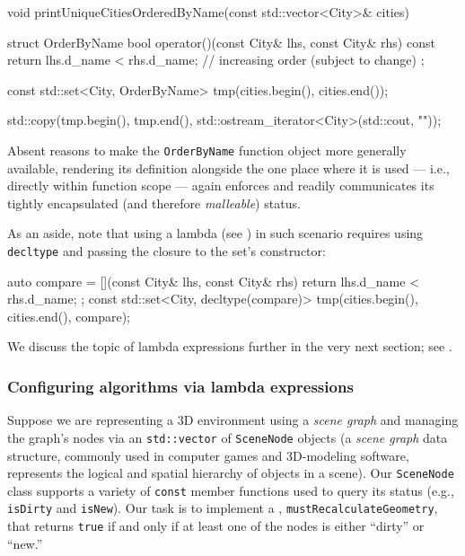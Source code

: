 \begin{emcppslisting}[language=C++]
void printUniqueCitiesOrderedByName(const std::vector<City>& cities)
{
    struct OrderByName
    {
        bool operator()(const City& lhs, const City& rhs) const
        {
            return lhs.d_name < rhs.d_name;
                // increasing order (subject to change)
        }
    };

    const std::set<City, OrderByName> tmp(cities.begin(), cities.end());

    std::copy(tmp.begin(), tmp.end(),
              std::ostream_iterator<City>(std::cout, "\n"));
}
\end{emcppslisting}

\noindent Absent reasons to make the \lstinline!OrderByName!
function object more generally available, rendering its definition
alongside the one place where it is used --- i.e., directly within
function scope --- again enforces and readily communicates its tightly
encapsulated (and therefore \emph{malleable}) status.

As an aside, note that using a lambda (see ) in such scenario requires using \lstinline!decltype! and passing the closure to the set's constructor:
\begin{emcppslisting}[language=C++]
auto compare = [](const City& lhs, const City& rhs) {
    return lhs.d_name < rhs.d_name;
};
const std::set<City, decltype(compare)>
    tmp(cities.begin(), cities.end(), compare);
\end{emcppslisting}

\noindent We discuss the topic of lambda expressions further in the very next section; see .

\subsubsection[Configuring algorithms via lambda expressions]{Configuring algorithms via lambda expressions}\label{configuring-algorithms-via-lambda-expressions}

Suppose we are representing a 3D environment using a \emph{scene
graph} and managing
the graph's nodes via an \lstinline!std::vector! of \lstinline!SceneNode!
objects (a \emph{scene graph} data structure, commonly
used in computer games and 3D-modeling software, represents the
  logical and spatial hierarchy of objects in a scene). Our \lstinline!SceneNode! class supports a variety of
\lstinline!const! member functions used to query its status (e.g.,
\lstinline!isDirty! and \lstinline!isNew!). Our task is to implement a
, \lstinline!mustRecalculateGeometry!, that
returns \lstinline!true! if and only if at least one of the nodes is either
``dirty'' or ``new.''

